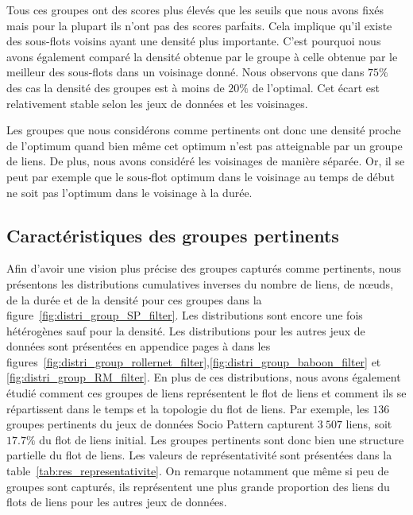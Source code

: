 Tous ces groupes ont des scores plus élevés que les seuils que nous avons fixés mais pour la plupart ils n'ont pas des scores parfaits.
Cela implique qu'il existe des sous-flots voisins ayant une densité plus importante.
C'est pourquoi nous avons également comparé la densité obtenue par le groupe à celle obtenue par le meilleur des sous-flots dans un voisinage donné.
Nous observons que dans $75\%$ des cas la densité des groupes est à moins de $20\%$ de l'optimal.
Cet écart est relativement stable selon les jeux de données et les voisinages.

Les groupes que nous considérons comme pertinents ont donc une densité proche de l'optimum quand bien même cet optimum n'est pas atteignable par un groupe de liens.
De plus, nous avons considéré les voisinages de manière séparée.
Or, il se peut par exemple que le sous-flot optimum dans le voisinage au temps de début ne soit pas l'optimum dans le voisinage à la durée.


\subsection{Caractéristiques des groupes pertinents}

Afin d'avoir une vision plus précise des groupes capturés comme pertinents, nous présentons les distributions cumulatives inverses du nombre de liens, de n\oe{}uds, de la durée et de la densité pour ces groupes dans la figure~\ref{fig:distri_group_SP_filter}.
Les distributions sont encore une fois hétérogènes sauf pour la densité.
Les distributions pour les autres jeux de données sont présentées en appendice pages \pageref{fig:distri_group_rollernet_filter} à \pageref{fig:distri_group_RM_filter} dans les figures~\ref{fig:distri_group_rollernet_filter},\ref{fig:distri_group_baboon_filter} et \ref{fig:distri_group_RM_filter}.
En plus de ces distributions, nous avons également étudié comment ces groupes de liens représentent le flot de liens et comment ils se répartissent dans le temps et la topologie du flot de liens.
Par exemple, les $136$ groupes pertinents du jeux de données Socio Pattern capturent $3\ 507$ liens, soit $17.7\%$ du flot de liens initial.
Les groupes pertinents sont donc bien une structure partielle du flot de liens.
Les valeurs de représentativité sont présentées dans la table~\ref{tab:res_representativite}.
On remarque notamment que même si peu de groupes sont capturés, ils représentent une plus grande proportion des liens du flots de liens pour les autres jeux de données.


